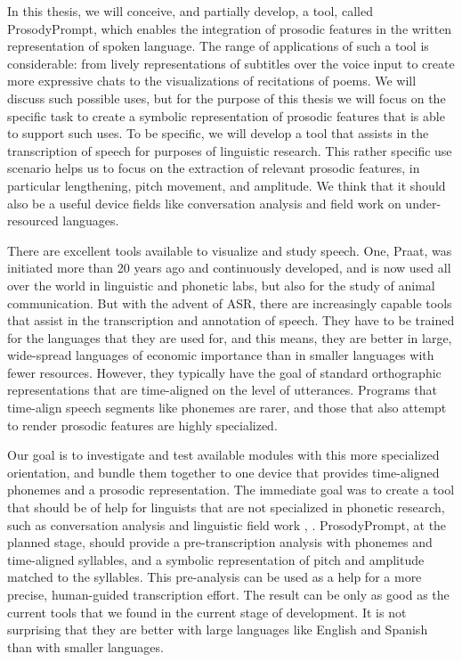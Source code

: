 In this thesis, we will conceive, and partially develop, a tool, called ProsodyPrompt, which enables the integration of prosodic features in the written representation of spoken language. The range of applications of such a tool is considerable: from lively representations of subtitles over the voice input to create more expressive chats to the visualizations of recitations of poems. We will discuss such possible uses, but for the purpose of this thesis we will focus on the specific task to create a symbolic representation of prosodic features that is able to support such uses. To be specific, we will develop a tool that assists in the transcription of speech for purposes of linguistic research. This rather specific use scenario helps us to focus on the extraction of relevant prosodic features, in particular lengthening, pitch movement, and amplitude. We think that it should also be a useful device fields like conversation analysis and field work on under-resourced languages. 

There are excellent tools available to visualize and study speech. One, Praat, was initiated more than 20 years ago and continuously developed, and is now used all over the world in linguistic and phonetic labs, but also for the study of animal communication. But with the advent of ASR, there are increasingly capable tools that assist in the transcription and annotation of speech. They have to be trained for the languages that they are used for, and this means, they are better in large, wide-spread languages of economic importance than in smaller languages with fewer resources. However, they typically have the goal of standard orthographic representations that are time-aligned on the level of utterances. Programs that time-align speech segments like phonemes are rarer, and those that also attempt to render prosodic features are highly specialized. 

Our goal is to investigate and test available modules with this more specialized orientation, and bundle them together to one device that provides time-aligned phonemes and a prosodic representation. The immediate goal was to create a tool that should be of help for linguists that are not specialized in phonetic research, such as conversation analysis \cite{hutchby2008} and linguistic field work \cite{thieberger2012}, \cite{rozhanskiy2021}. ProsodyPrompt, at the planned stage, should provide a pre-transcription analysis with phonemes and time-aligned syllables, and a symbolic representation of pitch and amplitude matched to the syllables. This pre-analysis can be used as a help for a more precise, human-guided transcription effort. The result can be only as good as the current tools that we found in the current stage of development. It is not surprising that they are better with large languages like English and Spanish than with smaller languages. 

